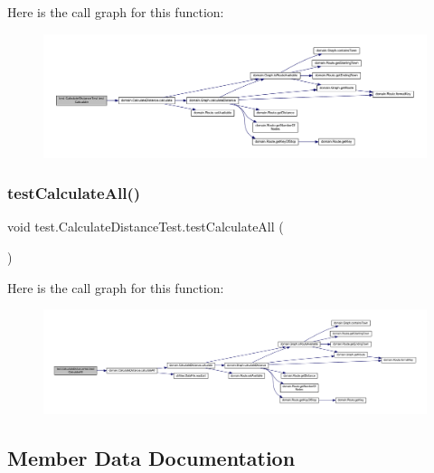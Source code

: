 Here is the call graph for this function\+:\nopagebreak
\begin{figure}[H]
\begin{center}
\leavevmode
\includegraphics[width=350pt]{classtest_1_1_calculate_distance_test_ae21407ac9f926798d08a69dfdbb6fcbe_cgraph}
\end{center}
\end{figure}
\mbox{\label{classtest_1_1_calculate_distance_test_ad6642d43b502c0bf9bd3876fc3303d14}} 
\subsubsection{\texorpdfstring{test\+Calculate\+All()}{testCalculateAll()}}
{\footnotesize\ttfamily void test.\+Calculate\+Distance\+Test.\+test\+Calculate\+All (\begin{DoxyParamCaption}{ }\end{DoxyParamCaption})}

Here is the call graph for this function\+:\nopagebreak
\begin{figure}[H]
\begin{center}
\leavevmode
\includegraphics[width=350pt]{classtest_1_1_calculate_distance_test_ad6642d43b502c0bf9bd3876fc3303d14_cgraph}
\end{center}
\end{figure}


\subsection{Member Data Documentation}
\mbox{\label{classtest_1_1_calculate_distance_test_aed188a5511ba8e51661627c7ec48bd00}} 
